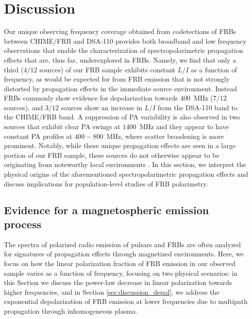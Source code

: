 \documentclass[twocolumn, linenumbers]{aastex701}
\begin{document}
\section{Discussion} \label{sec:discussion}
Our unique observing frequency coverage obtained from codetections of FRBs between CHIME/FRB and DSA-110 provides both broadband and low frequency observations that enable the characterization of spectropolarimetric propagation effects that are, thus far, underexplored in FRBs. Namely, we find that only a third ($4/12$ sources) of our FRB sample exhibits constant $L/I$ as a function of frequency, as would be expected for from FRB emission that is not strongly distorted by propagation effects in the immediate source environment. Instead FRBs commonly show evidence for depolarization towards $400$~MHz ($7/12$ sources), and $3/12$ sources show an increase in $L/I$ from the DSA-110 band to the CHIME/FRB band. A suppression of PA variability is also observed in two sources that exhibit clear PA swings at $1400$~MHz and they appear to have constant PA profiles at $400-800$~MHz, where scatter broadening is more prominent. Notably, while these unique propagation effects are seen in a large portion of our FRB sample, these sources do not otherwise appear to be originating from noteworthy local environments \citep[i.e., their $\mathrm{DM}_\mathrm{host}$, $\mathrm{RM}_\mathrm{host}$, and $\left<B_{\parallel,\mathrm{host}}\right>$ are typical compared to the polarized FRB populations observed by CHIME/FRB and DSA-110;][]{2024ApJ...968...50P, 2024ApJ...964..131S}. In this section, we interpret the physical origins of the aforementioned spectropolarimetric propagation effects and discuss implications for population-level studies of FRB polarimetry.

\subsection{Evidence for a magnetospheric emission process} \label{sec:discussion_emission}
The spectra of polarized radio emission of pulsars and FRBs are often analyzed for signatures of propagation effects through magnetized environments. Here, we focus on how the linear polarization fraction of FRB emission in our observed sample varies as a function of frequency, focusing on two physical scenarios: in this Section we discuss the power-law decrease in linear polarization towards higher frequencies, and in Section \ref{sec:discussion_depol}, we address the exponential depolarization of FRB emission at lower frequencies due to multipath propagation through inhomogeneous plasma.
\end{document}
